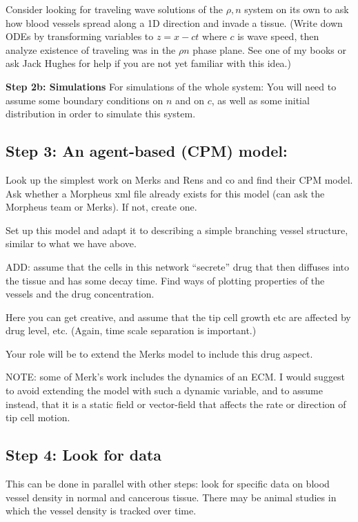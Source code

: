 Consider looking for traveling wave solutions of the $\rho,n$ system on its own to ask how blood vessels spread along a 1D direction and invade a tissue. (Write down ODEs by transforming variables to $z=x-ct$ where $c$ is wave speed, then analyze existence of traveling was in the $\rho n$ phase plane. See one of my books or ask Jack Hughes for help if you are not yet familiar with this idea.)


\textbf{Step 2b: Simulations}
For simulations of the whole system: You will need to assume some boundary conditions on $n$ and on $c$, as well as some initial distribution in order to simulate this system. 



\subsection{Step 3: An agent-based (CPM) model:}
Look up the simplest work on Merks and Rens and co and find their CPM model. Ask whether a Morpheus xml file already exists for this model (can ask the Morpheus team or Merks). If not, create one.

Set up this model and adapt it to describing a simple branching vessel structure, similar to what we have above.

ADD: assume that the cells in this network ``secrete'' drug that then diffuses into the tissue and has some decay time. Find ways of plotting properties of the vessels and the drug concentration. 

Here you can get creative, and assume that the tip cell growth etc are affected by drug level, etc. (Again, time scale separation is important.) 

Your role will be to extend the Merks model to include this drug aspect.

NOTE: some of Merk's work includes the dynamics of an ECM. I would suggest to avoid extending the model with such a dynamic variable, and to assume instead, that it is a static field or vector-field that affects the rate or direction of tip cell motion.

\subsection{Step 4: Look for data}

This can be done in parallel with other steps: look for specific data on blood vessel density in normal and cancerous tissue. There may be animal studies in which the vessel density is tracked over time.

